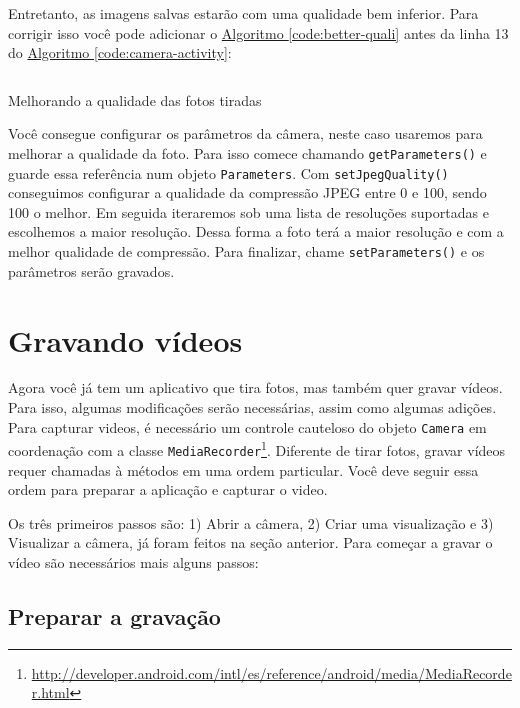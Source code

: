 \documentclass[a4paper,12pt,brazil,oneside]{book}
\begin{document}
\begin{singlespace}
		Entretanto, as imagens salvas estarão com uma qualidade bem inferior. Para corrigir isso você pode adicionar o \hyperref[code:better-quali]{Algoritmo \ref*{code:better-quali}} antes da linha 13 do \hyperref[code:camera-activity]{Algoritmo \ref*{code:camera-activity}}:
	
		\begin{listing}[H]
		\inputminted[linenos=true,fontsize=\small,frame=lines, framesep=2mm, tabsize=2,numbersep=5pt]{java}{src/api/camera/params.java}
		\caption{Melhorando a qualidade das fotos tiradas}
		\label{code:better-quali}
		\end{listing} 			

		Você consegue configurar os parâmetros da câmera, neste caso usaremos para melhorar a qualidade da foto. Para isso comece chamando \texttt{getParameters()} e guarde essa referência num objeto \texttt{Parameters}. Com \texttt{setJpegQuality()} conseguimos configurar a qualidade da compressão JPEG entre 0 e 100, sendo 100 o melhor. Em seguida iteraremos sob uma lista de resoluções suportadas e escolhemos a maior resolução. Dessa forma a foto terá a maior resolução e com a melhor qualidade de compressão.
		Para finalizar, chame \texttt{setParameters()} e os parâmetros serão gravados.

	\section{Gravando vídeos}

		Agora você já tem um aplicativo que tira fotos, mas também quer gravar vídeos. Para isso, algumas modificações serão necessárias, assim como algumas adições. Para capturar videos, é necessário um controle cauteloso do objeto \texttt{Camera} em coordenação com a classe \texttt{MediaRecorder}\footnote{\href{http://developer.android.com/intl/es/reference/android/media/MediaRecorder.html}{http://developer.android.com/intl/es/reference/android/media/MediaRecorder.html}}. Diferente de tirar fotos, gravar vídeos requer chamadas à métodos em uma ordem particular. Você deve seguir essa ordem para preparar a aplicação e capturar o video. 

		Os três primeiros passos são: 1) Abrir a câmera, 2) Criar uma visualização e 3) Visualizar a câmera, já foram feitos na seção anterior. Para começar a gravar o vídeo são necessários mais alguns passos:

	\subsection{Preparar a gravação}


\end{singlespace}
\end{document}
